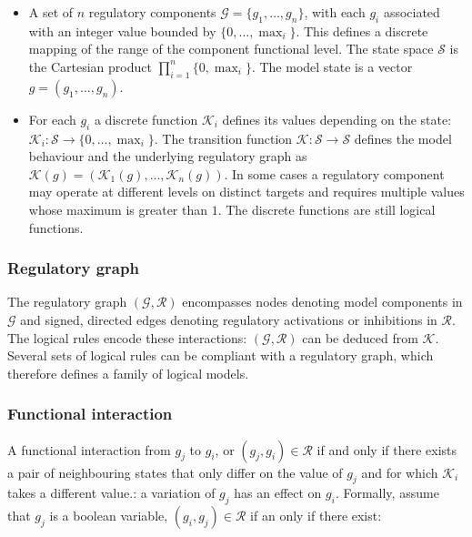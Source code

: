  \begin{multicols}{2}
    \begin{itemize}
      \item A set of $n$ regulatory components $\mathcal{G} = \{g_1, \dots, g_n\}$, with each $g_i$ associated with an integer value bounded by $\{0, \dots, \max_i\}$.
        This defines a discrete mapping of the range of the component functional level.
        The state space $\mathcal{S}$ is the Cartesian product $\prod\limits_{i=1}^n\{0, \max_i\}$.
        The model state is a vector $g = (g_1, \dots, g_n)$.
      \item For each $g_i$ a discrete function $\mathcal{K}_i$ defines its values depending on the state: $\mathcal{K}_i:\mathcal{S}\rightarrow\{0, \dots,\max_i\}$.
        The transition function $\mathcal{K}:\mathcal{S}\rightarrow\mathcal{S}$ defines the model behaviour and the underlying regulatory graph as $\mathcal{K}(g) = (\mathcal{K}_1(g), \dots, \mathcal{K}_n(g))$.
        In some cases a regulatory component may operate at different levels on distinct targets and requires multiple values whose maximum is greater than $1$.
        The discrete functions are still logical functions.
    \end{itemize}
  \end{multicols}

    \subsubsection{Regulatory graph}
    The regulatory graph $(\mathcal{G}, \mathcal{R})$ encompasses nodes denoting model components in $\mathcal{G}$ and signed, directed edges denoting regulatory activations or inhibitions in $\mathcal{R}$.
    The logical rules encode these interactions: $(\mathcal{G}, \mathcal{R})$ can be deduced from $\mathcal{K}$.
    Several sets of logical rules can be compliant with a regulatory graph, which therefore defines a family of logical models.

    \subsubsection{Functional interaction}
    A functional interaction from $g_j$ to $g_i$, or $(g_j, g_i)\in \mathcal{R}$ if and only if there exists a pair of neighbouring states that only differ on the value of $g_j$ and for which $\mathcal{K}_i$ takes a different value.: a variation of $g_j$ has an effect on $g_i$.
    Formally, assume that $g_j$ is a boolean variable, $(g_i, g_j)\in\mathcal{R}$ if an only if there exist:

